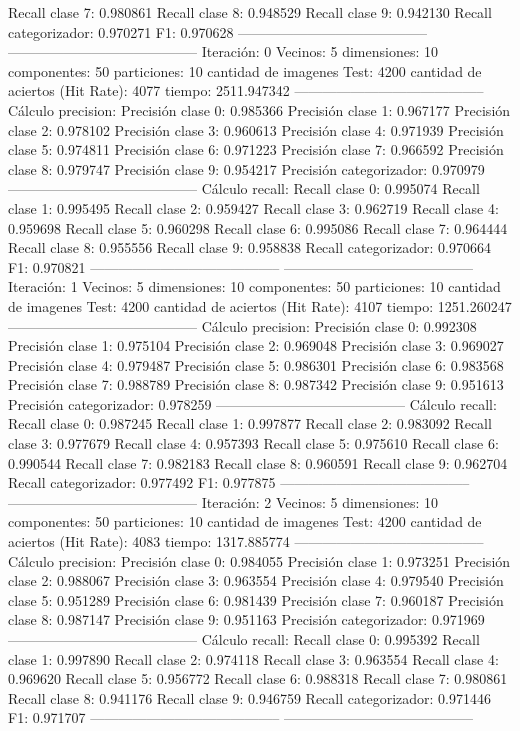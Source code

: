 Recall clase 7: 0.980861
Recall clase 8: 0.948529
Recall clase 9: 0.942130
Recall categorizador: 0.970271
F1: 0.970628
-----------------------------------------
-----------------------------------------
Iteración: 0
Vecinos: 5
dimensiones: 10
componentes: 50
particiones: 10
cantidad de imagenes Test: 4200
cantidad de aciertos (Hit Rate): 4077
tiempo: 2511.947342
-----------------------------------------
Cálculo precision: 
Precisión clase 0: 0.985366
Precisión clase 1: 0.967177
Precisión clase 2: 0.978102
Precisión clase 3: 0.960613
Precisión clase 4: 0.971939
Precisión clase 5: 0.974811
Precisión clase 6: 0.971223
Precisión clase 7: 0.966592
Precisión clase 8: 0.979747
Precisión clase 9: 0.954217
Precisión categorizador: 0.970979
-----------------------------------------
Cálculo recall: 
Recall clase 0: 0.995074
Recall clase 1: 0.995495
Recall clase 2: 0.959427
Recall clase 3: 0.962719
Recall clase 4: 0.959698
Recall clase 5: 0.960298
Recall clase 6: 0.995086
Recall clase 7: 0.964444
Recall clase 8: 0.955556
Recall clase 9: 0.958838
Recall categorizador: 0.970664
F1: 0.970821
-----------------------------------------
-----------------------------------------
Iteración: 1
Vecinos: 5
dimensiones: 10
componentes: 50
particiones: 10
cantidad de imagenes Test: 4200
cantidad de aciertos (Hit Rate): 4107
tiempo: 1251.260247
-----------------------------------------
Cálculo precision: 
Precisión clase 0: 0.992308
Precisión clase 1: 0.975104
Precisión clase 2: 0.969048
Precisión clase 3: 0.969027
Precisión clase 4: 0.979487
Precisión clase 5: 0.986301
Precisión clase 6: 0.983568
Precisión clase 7: 0.988789
Precisión clase 8: 0.987342
Precisión clase 9: 0.951613
Precisión categorizador: 0.978259
-----------------------------------------
Cálculo recall: 
Recall clase 0: 0.987245
Recall clase 1: 0.997877
Recall clase 2: 0.983092
Recall clase 3: 0.977679
Recall clase 4: 0.957393
Recall clase 5: 0.975610
Recall clase 6: 0.990544
Recall clase 7: 0.982183
Recall clase 8: 0.960591
Recall clase 9: 0.962704
Recall categorizador: 0.977492
F1: 0.977875
-----------------------------------------
-----------------------------------------
Iteración: 2
Vecinos: 5
dimensiones: 10
componentes: 50
particiones: 10
cantidad de imagenes Test: 4200
cantidad de aciertos (Hit Rate): 4083
tiempo: 1317.885774
-----------------------------------------
Cálculo precision: 
Precisión clase 0: 0.984055
Precisión clase 1: 0.973251
Precisión clase 2: 0.988067
Precisión clase 3: 0.963554
Precisión clase 4: 0.979540
Precisión clase 5: 0.951289
Precisión clase 6: 0.981439
Precisión clase 7: 0.960187
Precisión clase 8: 0.987147
Precisión clase 9: 0.951163
Precisión categorizador: 0.971969
-----------------------------------------
Cálculo recall: 
Recall clase 0: 0.995392
Recall clase 1: 0.997890
Recall clase 2: 0.974118
Recall clase 3: 0.963554
Recall clase 4: 0.969620
Recall clase 5: 0.956772
Recall clase 6: 0.988318
Recall clase 7: 0.980861
Recall clase 8: 0.941176
Recall clase 9: 0.946759
Recall categorizador: 0.971446
F1: 0.971707
-----------------------------------------
-----------------------------------------
